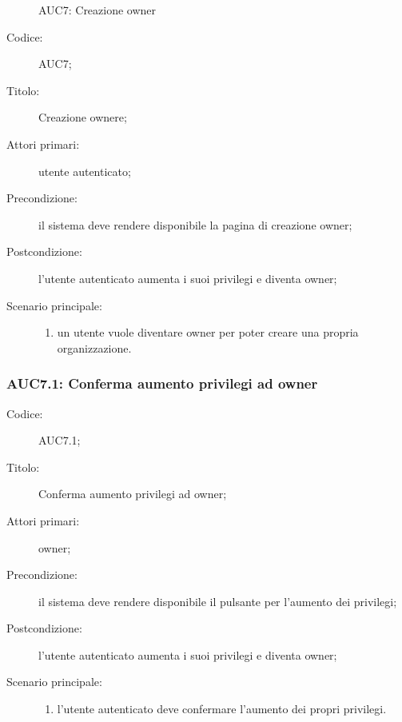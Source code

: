 \documentclass[../../../analisi-dei-requisiti.tex]{subfiles}
\begin{document}
\begin{figure}[H]
  \centering
  \caption{AUC7: Creazione owner}%
  \label{fig:AUC7}
\end{figure}

\begin{description}
  \item[Codice:] AUC7;
  \item[Titolo:] Creazione ownere;
  \item[Attori primari:] utente autenticato;
  \item[Precondizione:] il sistema deve rendere disponibile la pagina di creazione owner;
  \item[Postcondizione:] l'utente autenticato aumenta i suoi privilegi e diventa owner;
  \item[Scenario principale:]
  \begin{enumerate}
    \item un utente vuole diventare owner per poter creare una propria organizzazione.
  \end{enumerate}
\end{description}

\subsubsection{AUC7.1: Conferma aumento privilegi ad owner}%
\label{subs:AUC7.1}
\begin{description}
  \item[Codice:] AUC7.1;
  \item[Titolo:] Conferma aumento privilegi ad owner;
  \item[Attori primari:] owner;
  \item[Precondizione:] il sistema deve rendere disponibile il pulsante per l'aumento dei privilegi;
  \item[Postcondizione:] l'utente autenticato aumenta i suoi privilegi e diventa owner;
  \item[Scenario principale:]
  \begin{enumerate}
    \item l'utente autenticato deve confermare l'aumento dei propri privilegi.
  \end{enumerate}
\end{description}
\end{document}
